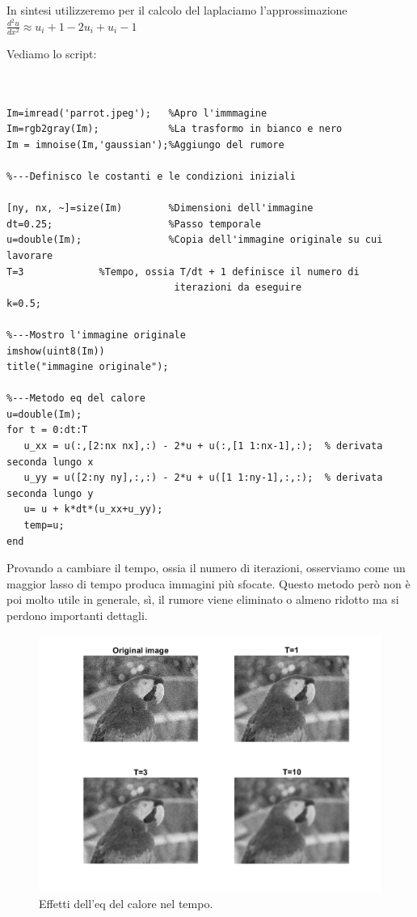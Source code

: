 In sintesi utilizzeremo per il calcolo del laplaciamo l'approssimazione \\
\vspace{2pt}
\centering 
$\frac{d^2u}{dx^2} \approx u_i+1 -2 u_i + u_i-1$\\
\vspace{2pt}
\raggedright
Vediamo lo script:

\begin{lstlisting}


Im=imread('parrot.jpeg');   %Apro l'immmagine
Im=rgb2gray(Im);            %La trasformo in bianco e nero
Im = imnoise(Im,'gaussian');%Aggiungo del rumore

%---Definisco le costanti e le condizioni iniziali

[ny, nx, ~]=size(Im)        %Dimensioni dell'immagine
dt=0.25;                    %Passo temporale
u=double(Im);               %Copia dell'immagine originale su cui lavorare
T=3			    %Tempo, ossia T/dt + 1 definisce il numero di
                             iterazioni da eseguire
k=0.5;

%---Mostro l'immagine originale
imshow(uint8(Im))
title("immagine originale"); 

%---Metodo eq del calore
u=double(Im);
for t = 0:dt:T
   u_xx = u(:,[2:nx nx],:) - 2*u + u(:,[1 1:nx-1],:);  % derivata seconda lungo x
   u_yy = u([2:ny ny],:,:) - 2*u + u([1 1:ny-1],:,:);  % derivata seconda lungo y
   u= u + k*dt*(u_xx+u_yy);
   temp=u;
end

\end{lstlisting}
\vspace{1em}
Provando a cambiare il tempo, ossia il numero di iterazioni, osserviamo come un maggior lasso di tempo produca immagini più sfocate. 
Questo metodo però non è poi molto utile in generale, sì, il rumore viene eliminato o almeno ridotto ma si perdono importanti dettagli.\\

\begin{figure}[htb] 
\centering
\includegraphics[scale=0.4]{Pictures/Risultati/eq del calore.png}
\caption{Effetti dell'eq del calore nel tempo.}\label{fig:figura}
\end{figure}

